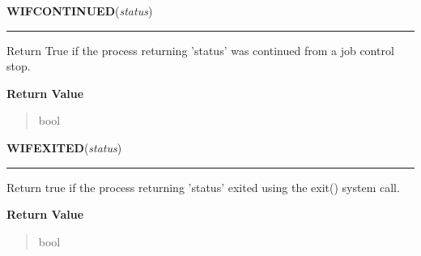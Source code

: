     \label{os:WIFCONTINUED}

    \vspace{0.5ex}

\hspace{.8\funcindent}\begin{boxedminipage}{\funcwidth}

    \raggedright \textbf{WIFCONTINUED}(\textit{status})

    \vspace{-1.5ex}

    \rule{\textwidth}{0.5\fboxrule}
\setlength{\parskip}{2ex}
    Return True if the process returning 'status' was continued from a job 
    control stop.

\setlength{\parskip}{1ex}
      \textbf{Return Value}
    \vspace{-1ex}

      \begin{quote}
      bool

      \end{quote}

    \end{boxedminipage}

    \label{os:WIFEXITED}

    \vspace{0.5ex}

\hspace{.8\funcindent}\begin{boxedminipage}{\funcwidth}

    \raggedright \textbf{WIFEXITED}(\textit{status})

    \vspace{-1.5ex}

    \rule{\textwidth}{0.5\fboxrule}
\setlength{\parskip}{2ex}
    Return true if the process returning 'status' exited using the exit() 
    system call.

\setlength{\parskip}{1ex}
      \textbf{Return Value}
    \vspace{-1ex}

      \begin{quote}
      bool

      \end{quote}

    \end{boxedminipage}

    \label{os:WIFSIGNALED}

